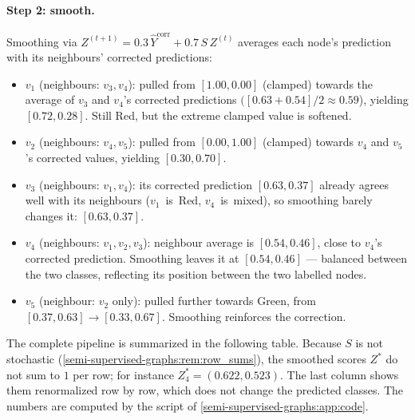 \begin{notechapter}
\paragraph{Step 2: smooth.} Smoothing via
$Z^{(t+1)} = 0.3\,\hat{Y}^{\text{corr}} + 0.7\,S\,Z^{(t)}$ averages
each node's prediction with its neighbours' corrected predictions:
\begin{itemize}
    \item $v_1$ (neighbours: $v_3, v_4$): pulled from $[1.00, 0.00]$
          (clamped) towards the average of $v_3$ and $v_4$'s corrected
          predictions $([0.63 + 0.54]/2 \approx 0.59$), yielding
          $[0.72, 0.28]$. Still Red, but the extreme clamped value is
          softened.
    \item $v_2$ (neighbours: $v_4, v_5$): pulled from $[0.00, 1.00]$
          (clamped) towards $v_4$ and $v_5$'s corrected values, yielding
          $[0.30, 0.70]$.
    \item $v_3$ (neighbours: $v_1, v_4$): its corrected prediction
          $[0.63, 0.37]$ already agrees well with its neighbours
          ($v_1$~is~Red, $v_4$~is~mixed), so smoothing barely changes it:
          $[0.63, 0.37]$.
    \item $v_4$ (neighbours: $v_1, v_2, v_3$): neighbour average is
          $[0.54, 0.46]$, close to $v_4$'s corrected prediction. Smoothing
          leaves it at $[0.54, 0.46]$ --- balanced between the two classes,
          reflecting its position between the two labelled nodes.
    \item $v_5$ (neighbour: $v_2$ only): pulled further towards Green,
          from $[0.37, 0.63] \to [0.33, 0.67]$. Smoothing reinforces the
          correction.
\end{itemize}

The complete pipeline is summarized in the following table. Because $S$ is not stochastic (\cref{semi-supervised-graphs:rem:row_sums}), the smoothed scores $Z^*$ do not sum to $1$ per row; for instance $Z^*_4 = (0.622, 0.523)$. The last column shows them renormalized row by row, which does not change the predicted classes. The numbers are computed by the script of \cref{semi-supervised-graphs:app:code}.


\end{notechapter}
